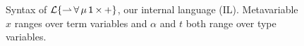 \documentclass[10pt,preprint]{sigplanconf}
\begin{document}
\begin{figure}[t]
\small
\hspace{-5px}
\caption{Syntax of {$\mathcal{L}\{{\rightharpoonup}\,{\forall}\,{\mu}\,{{\sf 1}}\,{\times}\,{+}\}$}, our internal language (IL). Metavariable $x$ ranges over term variables and $\alpha$ and $t$ both range over type variables.}
\label{syntax-IL}
\vspace{-10px}
\end{figure}
\end{document}
